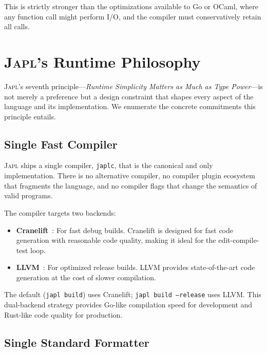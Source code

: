 \documentclass[11pt,twocolumn]{article}
\newcommand{\japl}{\textsc{Japl}}
\begin{document}
This is strictly stronger than the optimizations available to Go or OCaml, where any function call might perform I/O, and the compiler must conservatively retain all calls.

\section{\japl{}'s Runtime Philosophy}
\label{sec:runtime-philosophy}

\japl{}'s seventh principle---\emph{Runtime Simplicity Matters as Much as Type Power}---is not merely a preference but a design constraint that shapes every aspect of the language and its implementation.
We enumerate the concrete commitments this principle entails.

\subsection{Single Fast Compiler}

\japl{} ships a single compiler, \texttt{japlc}, that is the canonical and only implementation.
There is no alternative compiler, no compiler plugin ecosystem that fragments the language, and no compiler flags that change the semantics of valid programs.

The compiler targets two backends:
\begin{itemize}[leftmargin=*]
\item \textbf{Cranelift}~\citep{cranelift2020}: For fast debug builds. Cranelift is designed for fast code generation with reasonable code quality, making it ideal for the edit-compile-test loop.
\item \textbf{LLVM}~\citep{lattner2004llvm}: For optimized release builds. LLVM provides state-of-the-art code generation at the cost of slower compilation.
\end{itemize}

The default (\texttt{japl build}) uses Cranelift; \texttt{japl build --release} uses LLVM.
This dual-backend strategy provides Go-like compilation speed for development and Rust-like code quality for production.

\subsection{Single Standard Formatter}
\end{document}
